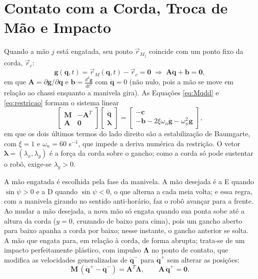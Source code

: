 \section{Contato com a Corda, Troca de Mão e Impacto}
\label{sec:contato}

Quando a mão $j$ está engatada, seu ponto $\vec{r}_{M_j}$ coincide com um ponto fixo da corda, $\vec{r}_c$:
\begin{equation}
  \mathbf{g}(\mathbf{q},t)=\vec r_M(\mathbf{q},t)-\vec r_c=\mathbf{0}
  \;\Rightarrow\;
  \mathbf{A}\ddot{\mathbf q}+\mathbf b=\mathbf 0,
  \label{eq:restricao}
\end{equation}
em que $\mathbf A=\partial\mathbf g/\partial\mathbf q$ e $\mathbf b=\frac{d^2\mathbf g}{dt^2}$ com $\ddot{\mathbf q}=0$ (não nulo, pois a mão se move em relação ao chassi enquanto a manivela gira). As Equações \ref{eq:Mqdd} e \ref{eq:restricao} formam o sistema linear
\begin{equation}
  \begin{bmatrix}\mathbf{M} & -\mathbf{A}^{T}\\ \mathbf{A} & \mathbf 0\end{bmatrix}
  \begin{bmatrix}\ddot{\mathbf q}\\ \boldsymbol\lambda\end{bmatrix}
  =
  \begin{bmatrix}-\mathbf c\\ -\mathbf b-2\xi\omega_n\dot{\mathbf g}-\omega_n^{2}\mathbf g\end{bmatrix},
  \label{eq:kkt}
\end{equation}
em que os dois últimos termos do lado direito são a estabilização de Baumgarte, com $\xi=1$ e $\omega_n=60$ s$^{-1}$, que impede a deriva numérica da restrição. O vetor $\boldsymbol\lambda=(\lambda_x,\lambda_y)$ é a força da corda sobre o gancho; como a corda só pode sustentar o robô, exige-se $\lambda_y>0$.

A mão engatada é escolhida pela fase da manivela. A mão desejada é a E quando $\sin\psi>0$ e a D quando $\sin\psi<0$, o que alterna a cada meia volta; e essa regra, com a manivela girando no sentido anti-horário, faz o robô avançar para a frente. Ao mudar a mão desejada, a nova mão só engata quando sua ponta sobe até a altura da corda ($y=0$, cruzando de baixo para cima), pois um gancho aberto para baixo apanha a corda por baixo; nesse instante, o gancho anterior se solta. A mão que engata para, em relação à corda, de forma abrupta; trata-se de um impacto perfeitamente plástico, com impulso $\boldsymbol\Lambda$ no ponto de contato, que modifica as velocidades generalizadas de $\dot{\mathbf q}^-$ para $\dot{\mathbf q}^+$ sem alterar as posições:
\begin{equation}
  \mathbf{M}\,(\dot{\mathbf q}^{+}-\dot{\mathbf q}^{-}) = \mathbf{A}^{T}\boldsymbol\Lambda,
  \qquad
  \mathbf{A}\,\dot{\mathbf q}^{+} = \mathbf 0 .
  \label{eq:impacto}
\end{equation}

